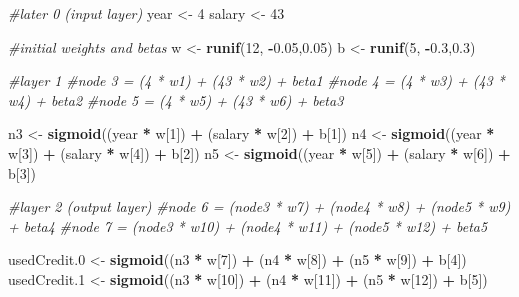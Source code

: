 \documentclass[]{article}
\newenvironment{Shaded}{\begin{snugshade}}{\end{snugshade}}
\newcommand{\KeywordTok}[1]{\textcolor[rgb]{0.13,0.29,0.53}{\textbf{#1}}}
\newcommand{\DecValTok}[1]{\textcolor[rgb]{0.00,0.00,0.81}{#1}}
\newcommand{\FloatTok}[1]{\textcolor[rgb]{0.00,0.00,0.81}{#1}}
\newcommand{\StringTok}[1]{\textcolor[rgb]{0.31,0.60,0.02}{#1}}
\newcommand{\CommentTok}[1]{\textcolor[rgb]{0.56,0.35,0.01}{\textit{#1}}}
\newcommand{\OperatorTok}[1]{\textcolor[rgb]{0.81,0.36,0.00}{\textbf{#1}}}
\newcommand{\NormalTok}[1]{#1}
\begin{document}
\begin{Shaded}
\begin{Highlighting}[]
\CommentTok{#later 0 (input layer)}
\NormalTok{year <-}\StringTok{ }\DecValTok{4}
\NormalTok{salary <-}\StringTok{ }\DecValTok{43}

\CommentTok{#initial weights and betas}
\NormalTok{w <-}\StringTok{ }\KeywordTok{runif}\NormalTok{(}\DecValTok{12}\NormalTok{, }\OperatorTok{-}\FloatTok{0.05}\NormalTok{,}\FloatTok{0.05}\NormalTok{)}
\NormalTok{b <-}\StringTok{ }\KeywordTok{runif}\NormalTok{(}\DecValTok{5}\NormalTok{, }\OperatorTok{-}\FloatTok{0.3}\NormalTok{,}\FloatTok{0.3}\NormalTok{)}

\CommentTok{#layer 1}
\CommentTok{#node 3 = (4 * w1) + (43 * w2) + beta1}
\CommentTok{#node 4 = (4 * w3) + (43 * w4) + beta2}
\CommentTok{#node 5 = (4 * w5) + (43 * w6) + beta3}

\NormalTok{n3 <-}\StringTok{ }\KeywordTok{sigmoid}\NormalTok{((year }\OperatorTok{*}\StringTok{ }\NormalTok{w[}\DecValTok{1}\NormalTok{]) }\OperatorTok{+}\StringTok{ }\NormalTok{(salary }\OperatorTok{*}\StringTok{ }\NormalTok{w[}\DecValTok{2}\NormalTok{]) }\OperatorTok{+}\StringTok{ }\NormalTok{b[}\DecValTok{1}\NormalTok{])}
\NormalTok{n4 <-}\StringTok{ }\KeywordTok{sigmoid}\NormalTok{((year }\OperatorTok{*}\StringTok{ }\NormalTok{w[}\DecValTok{3}\NormalTok{]) }\OperatorTok{+}\StringTok{ }\NormalTok{(salary }\OperatorTok{*}\StringTok{ }\NormalTok{w[}\DecValTok{4}\NormalTok{]) }\OperatorTok{+}\StringTok{ }\NormalTok{b[}\DecValTok{2}\NormalTok{])}
\NormalTok{n5 <-}\StringTok{ }\KeywordTok{sigmoid}\NormalTok{((year }\OperatorTok{*}\StringTok{ }\NormalTok{w[}\DecValTok{5}\NormalTok{]) }\OperatorTok{+}\StringTok{ }\NormalTok{(salary }\OperatorTok{*}\StringTok{ }\NormalTok{w[}\DecValTok{6}\NormalTok{]) }\OperatorTok{+}\StringTok{ }\NormalTok{b[}\DecValTok{3}\NormalTok{])}

\CommentTok{#layer 2 (output layer)}
\CommentTok{#node 6 = (node3 * w7) + (node4 * w8) + (node5 * w9) + beta4}
\CommentTok{#node 7 = (node3 * w10) + (node4 * w11) + (node5 * w12) + beta5}

\NormalTok{usedCredit.}\DecValTok{0}\NormalTok{ <-}\StringTok{ }\KeywordTok{sigmoid}\NormalTok{((n3 }\OperatorTok{*}\StringTok{ }\NormalTok{w[}\DecValTok{7}\NormalTok{]) }\OperatorTok{+}\StringTok{ }\NormalTok{(n4 }\OperatorTok{*}\StringTok{ }\NormalTok{w[}\DecValTok{8}\NormalTok{]) }\OperatorTok{+}\StringTok{ }\NormalTok{(n5 }\OperatorTok{*}\StringTok{ }\NormalTok{w[}\DecValTok{9}\NormalTok{]) }\OperatorTok{+}\StringTok{ }\NormalTok{b[}\DecValTok{4}\NormalTok{])}
\NormalTok{usedCredit.}\DecValTok{1}\NormalTok{ <-}\StringTok{ }\KeywordTok{sigmoid}\NormalTok{((n3 }\OperatorTok{*}\StringTok{ }\NormalTok{w[}\DecValTok{10}\NormalTok{]) }\OperatorTok{+}\StringTok{ }\NormalTok{(n4 }\OperatorTok{*}\StringTok{ }\NormalTok{w[}\DecValTok{11}\NormalTok{]) }\OperatorTok{+}\StringTok{ }\NormalTok{(n5 }\OperatorTok{*}\StringTok{ }\NormalTok{w[}\DecValTok{12}\NormalTok{]) }\OperatorTok{+}\StringTok{ }\NormalTok{b[}\DecValTok{5}\NormalTok{])}


\end{Highlighting}
\end{Shaded}
\end{document}
